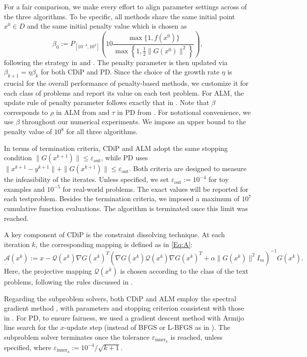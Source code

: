 \documentclass[11pt,a4paper,reqno]{amsart}
\begin{document}
{For a fair comparison, we make every effort to align parameter settings across of the three algorithms. To be specific, all methods share the same initial point $x^0\in D$ and the same initial penalty value which is chosen as
\begin{equation*}
    \beta_0:=P_{[10^{-3}, 10^3]} \left( 10 \frac{\max \{ 1, f(x^0)\}}{\max\left\{1, \frac{1}{2}\|G(x^0)\|^2\right\}}\right),
\end{equation*}
following the strategy in \cite[p.~153]{birgin2000nonmonotone} and \cite{jia2023augmented}. The penalty parameter is then updated via $\beta_{k+1}=\eta \beta_k$
for both CDiP and PD. Since the choice of the growth rate $\eta$ is crucial for the overall performance of penalty-based methods, we customize it for each class of problems and report its value on each test problem. For ALM, the update rule of penalty parameter follows exactly that in \cite{jia2023augmented}.
Note that $\beta$ corresponds to $\rho$ in ALM from \cite{jia2023augmented} and $\tau$ in PD from \cite{kanzow2023inexact}. For notational convenience, we use $\beta$ throughout our numerical experiments. We impose an upper bound to the penalty value of $10^8$ for all three algorithms.

 In terms of termination criteria,
 CDiP and ALM adopt the same stopping condition
$\|G(x^{k+1})\| \leq \varepsilon_{\text{out}}$,
while PD uses $\|x^{k+1}-y^{k+1}\|+\|G(x^{k+1})\| \leq \varepsilon_{\text{out}}$.
    Both criteria are designed to measure the infeasibility of the iterates. Unless specified, we set $\varepsilon_{\text{out}}:=10^{-4}$ for toy examples and $10^{-5}$ for real-world problems. The exact values will be reported for each testproblem. Besides the termination criteria, we imposed a maximum of $10^7$ cumulative function evaluations. The algorithm is terminated once this limit was reached.


A key component of CDiP is the constraint dissolving technique. At each iteration $k$, the corresponding mapping is defined as in \eqref{Eq:A}:
\begin{equation*}
    \mathcal A(x^k):=x-\mathcal Q(x^k)\nabla G(x^k)^T \left( \nabla G(x^k)\mathcal Q(x^k)\nabla G(x^k)^T+\alpha \| G(x^k)\|^2 I_m\right)^{-1} G(x^k).
\end{equation*}
Here, the projective mapping $\mathcal Q(x^k)$ is chosen according to the class of the text problems, following the rules discussed in .

Regarding the subproblem solvers, both CDiP and ALM employ the spectral gradient method \cite[Algorithm~3.1]{jia2023augmented}, with parameters and stopping criterion consistent with those in \cite[Section~6]{jia2023augmented}. For PD, to ensure fairness, we used a gradient descent method with Armijo line search for the $x$-update step (instead of BFGS or L-BFGS as in \cite{kanzow2023inexact}). The subproblem solver terminates once  the tolerance $\varepsilon_{\text{inner}_k}$ is reached, unless specified, where $\varepsilon_{\text{inner}_k}:={10^{-4}}/{\sqrt{k+1}}$. 

}
\end{document}
